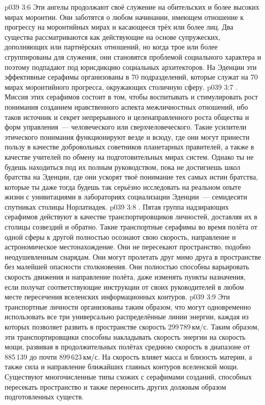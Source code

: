 \vs p039 3:6 Эти ангелы продолжают своё служение на обительских и более высоких мирах моронтии. Они заботятся о любом начинании, имеющем отношение к прогрессу на моронтийных мирах и касающееся трёх или более лиц. Два существа рассматриваются как действующие на основе супружеских, дополняющих или партнёрских отношений, но когда трое или более сгруппированы для служения, они становятся проблемой социального характера и поэтому подпадают под юрисдикцию социальных архитекторов. На Эденции эти эффективные серафимы организованы в 70 подразделений, которые служат на 70 мирах моронтийного прогресса, окружающих столичную сферу.
\vs p039 3:7 . Миссия этих серафимов состоит в том, чтобы воспитывать и стимулировать рост понимания созданием нравственного аспекта межличностных отношений, ибо таков источник и секрет непрерывного и целенаправленного роста общества и форм управления~--- человеческого или сверхчеловеческого. Такие усилители этического понимания функционируют везде и всюду, где они могут принести пользу в качестве добровольных советников планетарных правителей, а также в качестве учителей по обмену на подготовительных мирах систем. Однако ты не будешь находиться под их полным руководством, пока не достигнешь школ братства на Эденции, где они ускорят твоё понимание тех самых истин братства, которые ты даже тогда будешь так серьёзно исследовать на реальном опыте жизни с унивитациями в лабораториях социализации Эденции~--- семидесяти спутниках столицы Норлатиадек.
\vs p039 3:8 . Пятая группа надзирающих серафимов действуют в качестве транспортировщиков личностей, доставляя их в столицы созвездий и обратно. Такие транспортные серафимы во время полёта от одной сферы к другой полностью осознают свою скорость, направление и астрономическое местонахождение. Они не пересекают пространство, подобно неодушевленным снарядам. Они могут пролетать друг мимо друга в пространстве без малейшей опасности столкновения. Они полностью способны варьировать скорость движения и направление полёта, даже изменять пункты назначения, если получат соответствующие инструкции от своих руководителей в любом месте пересечения вселенских информационных контуров.
\vs p039 3:9 Эти транспортные личности организованы таким образом, что могут одновременно использовать все три универсально распределённые линии энергии, каждая из которых позволяет развить в пространстве скорость 299\,789\,км/с. Таким образом, эти транспортировщики способны накладывать скорость энергии на скорость мощи, развивая в продолжительных полётах среднюю скорость в диапазоне от 885\,139 до почти 899\,623\,км/с. На скорость влияет масса и близость материи, а также сила и направление ближайших главных контуров вселенской мощи. Существуют многочисленные типы схожих с серафимами созданий, способных пересекать пространство и также переносить других должным образом подготовленных существ.
